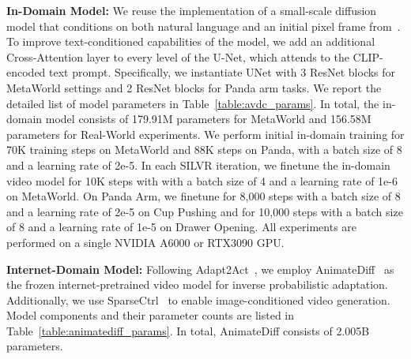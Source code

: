 \textbf{In-Domain Model:} We reuse the implementation of a small-scale diffusion model that conditions on both natural language and an initial pixel frame from~\citep{ko2024avdc}.  To improve text-conditioned capabilities of the model, we add an additional Cross-Attention layer to every level of the U-Net, which attends to the CLIP-encoded text prompt. Specifically, we instantiate UNet with 3 ResNet blocks for MetaWorld settings and 2 ResNet blocks for Panda arm tasks. We report the detailed list of model parameters in Table~\ref{table:avdc_params}. In total, the in-domain model consists of 179.91M parameters for MetaWorld and 156.58M parameters for Real-World experiments. We perform initial in-domain training for 70K training steps on MetaWorld and 88K steps on Panda, with a batch size of 8 and a learning rate of 2e-5. In each SILVR iteration, we finetune the in-domain video model for 10K steps with with a batch size of 4 and a learning rate of 1e-6 on MetaWorld. On Panda Arm, we finetune for 8,000 steps with a batch size of 8 and a learning rate of 2e-5 on Cup Pushing and for 10,000 steps with a batch size of 8 and a learning rate of 1e-5 on Drawer Opening. All experiments are performed on a single NVIDIA A6000 or RTX3090 GPU.

\begin{table}[ht]
\centering
\setlength{\tabcolsep}{4.8pt}

\vspace{1em}
\caption{\textbf{In-Domain Model Components.} SILVR relies on a small in-domain text-to-video model, which we base our implementation off of prior work~\citep{ko2024avdc}.  We list the size of the components of the model architecture used.}
\label{table:avdc_params}
\end{table}

\textbf{Internet-Domain Model:} Following Adapt2Act~\citep{luo2025solving}, we employ AnimateDiff~\citep{guo2023animatediff} as the frozen internet-pretrained video model for inverse probabilistic adaptation. Additionally, we use SparseCtrl~\citep{Guo2024ECCV_SparseCtrl_Adding_Sparse} to enable image-conditioned video generation. Model components and their parameter counts are listed in Table~\ref{table:animatediff_params}. In total, AnimateDiff consists of 2.005B parameters.

